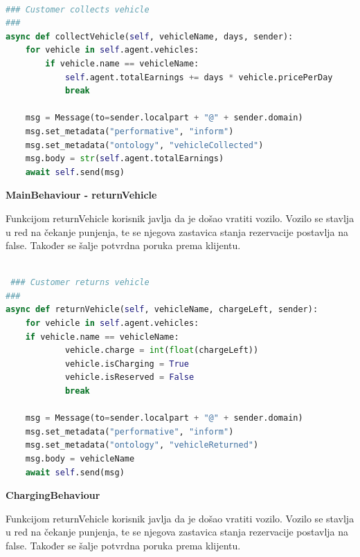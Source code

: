 \documentclass{foi}
\begin{document}
\begin{lstlisting}[language=Python]

### Customer collects vehicle
###
async def collectVehicle(self, vehicleName, days, sender):
	for vehicle in self.agent.vehicles:
		if vehicle.name == vehicleName:
			self.agent.totalEarnings += days * vehicle.pricePerDay
			break
	
	msg = Message(to=sender.localpart + "@" + sender.domain)
	msg.set_metadata("performative", "inform")
	msg.set_metadata("ontology", "vehicleCollected")
	msg.body = str(self.agent.totalEarnings)
	await self.send(msg)

\end{lstlisting}

\begin{flushleft}\textbf{MainBehaviour - returnVehicle}\end{flushleft}

Funkcijom returnVehicle korisnik javlja da je došao vratiti vozilo. Vozilo se stavlja u red na čekanje punjenja, te se njegova zastavica stanja rezervacije postavlja na false. Također se šalje potvrdna poruka prema klijentu.

\begin{lstlisting}[language=Python]

 ### Customer returns vehicle
###
async def returnVehicle(self, vehicleName, chargeLeft, sender):
	for vehicle in self.agent.vehicles:
	if vehicle.name == vehicleName:
			vehicle.charge = int(float(chargeLeft))
			vehicle.isCharging = True
			vehicle.isReserved = False
			break
	
	msg = Message(to=sender.localpart + "@" + sender.domain)
	msg.set_metadata("performative", "inform")
	msg.set_metadata("ontology", "vehicleReturned")
	msg.body = vehicleName
	await self.send(msg)

\end{lstlisting}

\begin{flushleft}\textbf{ChargingBehaviour}\end{flushleft}

Funkcijom returnVehicle korisnik javlja da je došao vratiti vozilo. Vozilo se stavlja u red na čekanje punjenja, te se njegova zastavica stanja rezervacije postavlja na false. Također se šalje potvrdna poruka prema klijentu.
\end{document}
